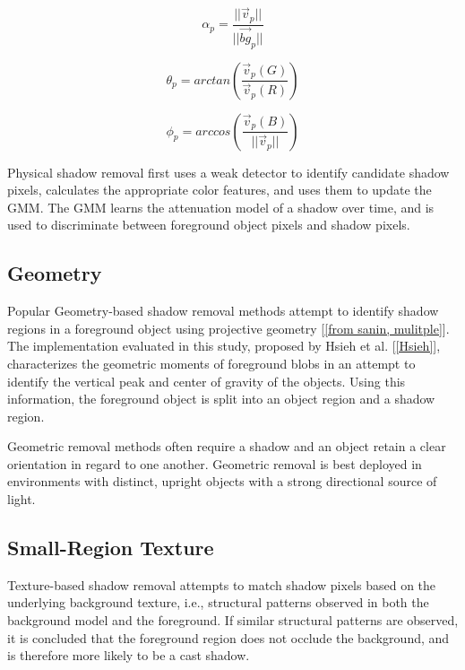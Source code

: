 \documentclass[12pt]{report}
\begin{document}
\begin{equation} \label{eqn:alphaatten}
\alpha_{p} = \dfrac{||\vec{v}_{p}||}{||\vec{bg}_{p}||}
\end{equation}

\begin{equation} \label{eqn:rgangle}
\theta_{p} = arctan(\dfrac{\vec{v}_{p}(G)}{\vec{v}_{p}(R)})
\end{equation}

\begin{equation} \label{eqn:bangle}
\phi_{p} = arccos(\dfrac{\vec{v}_{p}(B)}{||\vec{v}_{p}||})
\end{equation}

Physical shadow removal first uses a weak detector to identify candidate shadow pixels, calculates the appropriate color features, and uses them to update the GMM. The GMM learns the attenuation model of a shadow over time, and is used to discriminate between foreground object pixels and shadow pixels.

\subsection{Geometry}

Popular Geometry-based shadow removal methods attempt to identify shadow regions in a foreground object using projective geometry [\ref{from sanin, mulitple}]. The implementation evaluated in this study, proposed by Hsieh et al. [\ref{Hsieh}], characterizes the geometric moments of foreground blobs in an attempt to identify the vertical peak and center of gravity of the objects. Using this information, the foreground object is split into an object region and a shadow region.

Geometric removal methods often require a shadow and an object retain a clear orientation in regard to one another. Geometric removal is best deployed in environments with distinct, upright objects with a strong directional source of light.  

\subsection{Small-Region Texture}

Texture-based shadow removal attempts to match shadow pixels based on the underlying background texture, i.e., structural patterns observed in both the background model and the foreground. If similar structural patterns are observed, it is concluded that the foreground region does not occlude the background, and is therefore more likely to be a cast shadow.
\end{document}
